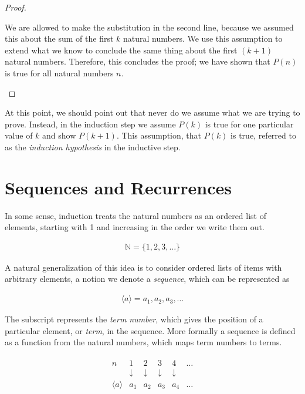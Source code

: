 \documentclass[twoside]{report}
\begin{document}
\begin{proof}
\begin{enumerate}
		We are allowed to make the substitution in the second line, because we assumed this about the sum of the first $k$ natural numbers. We use this assumption to extend what we know to conclude the same thing about the first $(k + 1)$ natural numbers. Therefore, this concludes the proof; we have shown that $P(n)$ is true for all natural numbers $n$.
	\end{enumerate}
\end{proof}
\vspace{\baselineskip}

At this point, we should point out that never do we assume what we are trying to prove. Instead, in the induction step we assume $P(k)$ is true for one particular value of $k$ and show $P(k + 1)$. This assumption, that $P(k)$ is true, referred to as the \emph{induction hypothesis} in the inductive step.


\section{Sequences and Recurrences}

In some sense, induction treats the natural numbers as an ordered list of elements, starting with 1 and increasing in the order we write them out.

\begin{align*}
	\mathbb{N} = \{ 1, 2, 3, \dots \}
\end{align*}

A natural generalization of this idea is to consider ordered lists of items with arbitrary elements, a notion we denote a \emph{sequence}, which can be represented as

\begin{align*}
	\langle a \rangle = a_1, a_2, a_3, \dots
\end{align*}


The subscript represents the \emph{term number}, which gives the position of a particular element, or \emph{term}, in the sequence. More formally a sequence is defined as a function from the natural numbers, which maps term numbers to terms.

\begin{align*}
	\begin{array}{rrrrrr}
		n & 1 & 2 & 3 & 4 & \dots \\
		& \downarrow & \downarrow & \downarrow & \downarrow & \\
		\langle a \rangle & a_1 & a_2 & a_3 & a_4 & \dots
	\end{array}
\end{align*}
\end{document}
